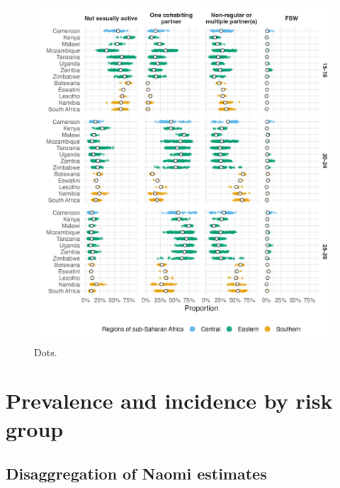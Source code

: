 \documentclass[a4paper, nobind]{templates/ociamthesis}
\begin{document}
\begin{figure}

{\centering \includegraphics[width=0.95\linewidth]{resources/multi-agyw/20230627-144735-3da88508/depends/3p1-within-between-country-variation} 

}

\caption{Dots.}\label{fig:3p1-within-between-country-variation}
\end{figure}

\hypertarget{prevalence-and-incidence-by-risk-group}{%
\section{Prevalence and incidence by risk group}\label{prevalence-and-incidence-by-risk-group}}

\hypertarget{disaggregation-of-naomi-estimates}{%
\subsection{Disaggregation of Naomi estimates}\label{disaggregation-of-naomi-estimates}}
\end{document}
